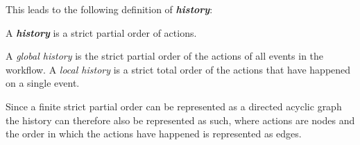 	\newpar This leads to the following definition of \textbf{\textit{history}}:
	
	\begin{definition}
		A \textit{\textbf{history}} is a strict partial order of actions.
	\end{definition}
	
    \noindent A \textit{global history} is the strict partial order of the actions of all events in the workflow. A \textit{local history} is a strict total order of the actions that have happened on a single event.
    
    \newpar Since a finite strict partial order can be represented as a directed acyclic graph the history can therefore also be represented as such, where actions are nodes and the order in which the actions have happened is represented as edges.

	

	
